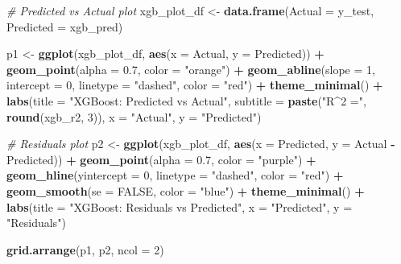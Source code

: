 \documentclass[
]{article}
\newenvironment{Shaded}{\begin{snugshade}}{\end{snugshade}}
\newcommand{\AttributeTok}[1]{\textcolor[rgb]{0.13,0.29,0.53}{#1}}
\newcommand{\CommentTok}[1]{\textcolor[rgb]{0.56,0.35,0.01}{\textit{#1}}}
\newcommand{\ConstantTok}[1]{\textcolor[rgb]{0.56,0.35,0.01}{#1}}
\newcommand{\DecValTok}[1]{\textcolor[rgb]{0.00,0.00,0.81}{#1}}
\newcommand{\FloatTok}[1]{\textcolor[rgb]{0.00,0.00,0.81}{#1}}
\newcommand{\FunctionTok}[1]{\textcolor[rgb]{0.13,0.29,0.53}{\textbf{#1}}}
\newcommand{\NormalTok}[1]{#1}
\newcommand{\OtherTok}[1]{\textcolor[rgb]{0.56,0.35,0.01}{#1}}
\newcommand{\SpecialCharTok}[1]{\textcolor[rgb]{0.81,0.36,0.00}{\textbf{#1}}}
\newcommand{\StringTok}[1]{\textcolor[rgb]{0.31,0.60,0.02}{#1}}
\begin{document}
\begin{Shaded}
\begin{Highlighting}[]
\CommentTok{\# Predicted vs Actual plot}
\NormalTok{xgb\_plot\_df }\OtherTok{\textless{}{-}} \FunctionTok{data.frame}\NormalTok{(}\AttributeTok{Actual =}\NormalTok{ y\_test, }\AttributeTok{Predicted =}\NormalTok{ xgb\_pred)}

\NormalTok{p1 }\OtherTok{\textless{}{-}} \FunctionTok{ggplot}\NormalTok{(xgb\_plot\_df, }\FunctionTok{aes}\NormalTok{(}\AttributeTok{x =}\NormalTok{ Actual, }\AttributeTok{y =}\NormalTok{ Predicted)) }\SpecialCharTok{+}
  \FunctionTok{geom\_point}\NormalTok{(}\AttributeTok{alpha =} \FloatTok{0.7}\NormalTok{, }\AttributeTok{color =} \StringTok{"orange"}\NormalTok{) }\SpecialCharTok{+}
  \FunctionTok{geom\_abline}\NormalTok{(}\AttributeTok{slope =} \DecValTok{1}\NormalTok{, }\AttributeTok{intercept =} \DecValTok{0}\NormalTok{, }\AttributeTok{linetype =} \StringTok{"dashed"}\NormalTok{, }\AttributeTok{color =} \StringTok{"red"}\NormalTok{) }\SpecialCharTok{+}
  \FunctionTok{theme\_minimal}\NormalTok{() }\SpecialCharTok{+}
  \FunctionTok{labs}\NormalTok{(}\AttributeTok{title =} \StringTok{"XGBoost: Predicted vs Actual"}\NormalTok{,}
       \AttributeTok{subtitle =} \FunctionTok{paste}\NormalTok{(}\StringTok{"R\^{}2 ="}\NormalTok{, }\FunctionTok{round}\NormalTok{(xgb\_r2, }\DecValTok{3}\NormalTok{)),}
       \AttributeTok{x =} \StringTok{"Actual"}\NormalTok{, }\AttributeTok{y =} \StringTok{"Predicted"}\NormalTok{)}

\CommentTok{\# Residuals plot}
\NormalTok{p2 }\OtherTok{\textless{}{-}} \FunctionTok{ggplot}\NormalTok{(xgb\_plot\_df, }\FunctionTok{aes}\NormalTok{(}\AttributeTok{x =}\NormalTok{ Predicted, }\AttributeTok{y =}\NormalTok{ Actual }\SpecialCharTok{{-}}\NormalTok{ Predicted)) }\SpecialCharTok{+}
  \FunctionTok{geom\_point}\NormalTok{(}\AttributeTok{alpha =} \FloatTok{0.7}\NormalTok{, }\AttributeTok{color =} \StringTok{"purple"}\NormalTok{) }\SpecialCharTok{+}
  \FunctionTok{geom\_hline}\NormalTok{(}\AttributeTok{yintercept =} \DecValTok{0}\NormalTok{, }\AttributeTok{linetype =} \StringTok{"dashed"}\NormalTok{, }\AttributeTok{color =} \StringTok{"red"}\NormalTok{) }\SpecialCharTok{+}
  \FunctionTok{geom\_smooth}\NormalTok{(}\AttributeTok{se =} \ConstantTok{FALSE}\NormalTok{, }\AttributeTok{color =} \StringTok{"blue"}\NormalTok{) }\SpecialCharTok{+}
  \FunctionTok{theme\_minimal}\NormalTok{() }\SpecialCharTok{+}
  \FunctionTok{labs}\NormalTok{(}\AttributeTok{title =} \StringTok{"XGBoost: Residuals vs Predicted"}\NormalTok{,}
       \AttributeTok{x =} \StringTok{"Predicted"}\NormalTok{, }\AttributeTok{y =} \StringTok{"Residuals"}\NormalTok{)}

\FunctionTok{grid.arrange}\NormalTok{(p1, p2, }\AttributeTok{ncol =} \DecValTok{2}\NormalTok{)}
\end{Highlighting}
\end{Shaded}
\end{document}
